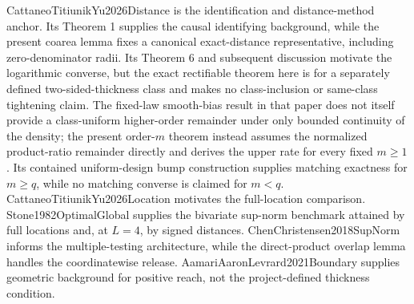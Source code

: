 CattaneoTitiunikYu2026Distance is the identification and distance-method anchor.  Its Theorem 1 supplies the causal identifying background, while the present coarea lemma fixes a canonical exact-distance representative, including zero-denominator radii.  Its Theorem 6 and subsequent discussion motivate the logarithmic converse, but the exact rectifiable theorem here is for a separately defined two-sided-thickness class and makes no class-inclusion or same-class tightening claim.  The fixed-law smooth-bias result in that paper does not itself provide a class-uniform higher-order remainder under only bounded continuity of the density; the present order-\(m\) theorem instead assumes the normalized product-ratio remainder directly and derives the upper rate for every fixed \(m\geq1\).  Its contained uniform-design bump construction supplies matching exactness for \(m\geq q\), while no matching converse is claimed for \(m<q\).  CattaneoTitiunikYu2026Location motivates the full-location comparison.  Stone1982OptimalGlobal supplies the bivariate sup-norm benchmark attained by full locations and, at \(L=4\), by signed distances.  ChenChristensen2018SupNorm informs the multiple-testing architecture, while the direct-product overlap lemma handles the coordinatewise release.  AamariAaronLevrard2021Boundary supplies geometric background for positive reach, not the project-defined thickness condition.